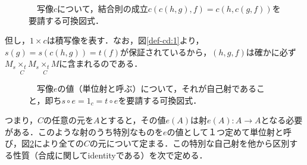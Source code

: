\documentclass[uplatex, 12pt, dvipdfmx]{jsreport}
\begin{document}
\begin{figure}[ht] \begin{center}  \caption{\label{def-cd:2}　写像$c$について，結合則の成立$c(c(h,g),f)=c(h,c(g,f))$を要請する可換図式．}
\end{center}\end{figure}
但し，$1\times c$は積写像を表す．なお，図\ref{def-cd:1}より，$s(g)=s(c(h,g))=t(f)$が保証されているから，$(h,g,f)$は確かに必ず$M_s \underset{C}{\times_t}M_s \underset{C}{\times_t}M$に含まれるのである．

\begin{figure}[ht] \begin{center}  \caption{\label{def-cd:3}　写像$e$の値（単位射と呼ぶ）について，それが自己射であること，即ち$s\circ e=1_c=t\circ e$を要請する可換図式．}
\end{center}\end{figure}
つまり，$C$の任意の元を$A$とすると，その値$e(A)$は射$e(A):A\rightarrow A$となる必要がある．このような射のうち特別なものを$e$の値として１つ定めて単位射と呼び，図\ref{def-cd:3}により全ての$C$の元について定まる．この特別な自己射を他から区別する性質（合成に関して\textrm{identity}である）を次で定める．
\end{document}
